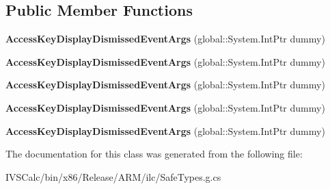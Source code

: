 \subsection*{Public Member Functions}
\begin{DoxyCompactItemize}
\item 
\mbox{\label{class_windows_1_1_u_i_1_1_xaml_1_1_input_1_1_access_key_display_dismissed_event_args_aae40198a664ae0be915ad9dc3a647124}} 
{\bfseries Access\+Key\+Display\+Dismissed\+Event\+Args} (global\+::\+System.\+Int\+Ptr dummy)
\item 
\mbox{\label{class_windows_1_1_u_i_1_1_xaml_1_1_input_1_1_access_key_display_dismissed_event_args_aae40198a664ae0be915ad9dc3a647124}} 
{\bfseries Access\+Key\+Display\+Dismissed\+Event\+Args} (global\+::\+System.\+Int\+Ptr dummy)
\item 
\mbox{\label{class_windows_1_1_u_i_1_1_xaml_1_1_input_1_1_access_key_display_dismissed_event_args_aae40198a664ae0be915ad9dc3a647124}} 
{\bfseries Access\+Key\+Display\+Dismissed\+Event\+Args} (global\+::\+System.\+Int\+Ptr dummy)
\item 
\mbox{\label{class_windows_1_1_u_i_1_1_xaml_1_1_input_1_1_access_key_display_dismissed_event_args_aae40198a664ae0be915ad9dc3a647124}} 
{\bfseries Access\+Key\+Display\+Dismissed\+Event\+Args} (global\+::\+System.\+Int\+Ptr dummy)
\item 
\mbox{\label{class_windows_1_1_u_i_1_1_xaml_1_1_input_1_1_access_key_display_dismissed_event_args_aae40198a664ae0be915ad9dc3a647124}} 
{\bfseries Access\+Key\+Display\+Dismissed\+Event\+Args} (global\+::\+System.\+Int\+Ptr dummy)
\end{DoxyCompactItemize}


The documentation for this class was generated from the following file\+:\begin{DoxyCompactItemize}
\item 
I\+V\+S\+Calc/bin/x86/\+Release/\+A\+R\+M/ilc/Safe\+Types.\+g.\+cs\end{DoxyCompactItemize}
